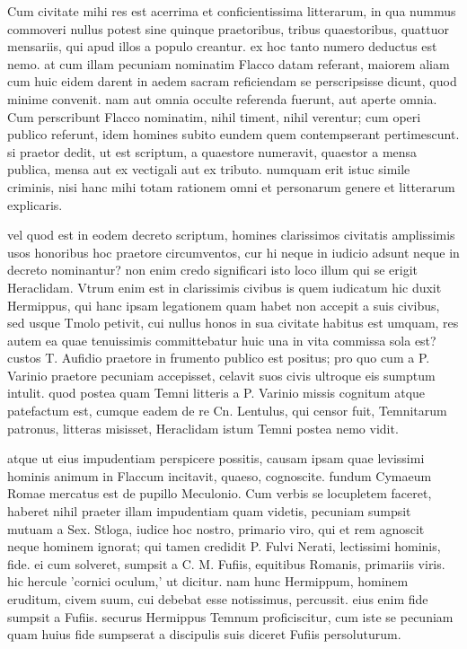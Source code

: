  Cum civitate mihi res est acerrima et conficientissima litterarum, in qua nummus commoveri nullus potest sine quinque praetoribus, tribus quaestoribus, quattuor mensariis, qui apud illos a populo creantur. ex hoc tanto numero deductus est nemo. at cum illam pecuniam nominatim Flacco datam referant, maiorem aliam cum huic eidem darent in aedem sacram reficiendam se perscripsisse dicunt, quod minime convenit. nam aut omnia occulte referenda fuerunt, aut aperte omnia. Cum perscribunt Flacco nominatim, nihil timent, nihil verentur; cum operi publico referunt, idem homines subito eundem quem contempserant pertimescunt. si praetor dedit, ut est scriptum, a quaestore numeravit, quaestor a mensa publica, mensa aut ex vectigali aut ex tributo. numquam erit istuc simile criminis, nisi hanc mihi totam rationem omni et personarum genere et litterarum explicaris.

 vel quod est in eodem decreto scriptum, homines clarissimos civitatis amplissimis usos honoribus hoc praetore circumventos, cur hi neque in iudicio adsunt neque in decreto nominantur? non enim credo significari isto loco illum qui se erigit Heraclidam. Vtrum enim est in clarissimis civibus is quem iudicatum hic duxit Hermippus, qui hanc ipsam legationem quam habet non accepit a suis civibus, sed usque Tmolo petivit, cui nullus honos in sua civitate habitus est umquam, res autem ea quae tenuissimis committebatur huic una in vita commissa sola est? custos T. Aufidio praetore in frumento publico est positus; pro quo cum a P. Varinio praetore pecuniam accepisset, celavit suos civis ultroque eis sumptum intulit. quod postea quam Temni litteris a P. Varinio missis cognitum atque patefactum est, cumque eadem de re Cn. Lentulus, qui censor fuit, Temnitarum patronus, litteras misisset, Heraclidam istum Temni postea nemo vidit.

 atque ut eius impudentiam perspicere possitis, causam ipsam quae levissimi hominis animum in Flaccum incitavit, quaeso, cognoscite. fundum Cymaeum Romae mercatus est de pupillo Meculonio. Cum verbis se locupletem faceret, haberet nihil praeter illam impudentiam quam videtis, pecuniam sumpsit mutuam a Sex. Stloga, iudice hoc nostro, primario viro, qui et rem agnoscit neque hominem ignorat; qui tamen credidit P. Fulvi Nerati, lectissimi hominis, fide. ei cum solveret, sumpsit a C. M. Fufiis, equitibus Romanis, primariis viris. hic hercule 'cornici oculum,' ut dicitur. nam hunc Hermippum, hominem eruditum, civem suum, cui debebat esse notissimus, percussit. eius enim fide sumpsit a Fufiis. securus Hermippus Temnum proficiscitur, cum iste se pecuniam quam huius fide sumpserat a discipulis suis diceret Fufiis persoluturum.

